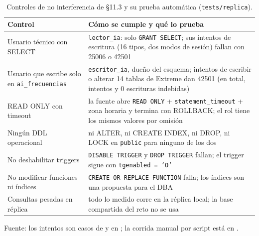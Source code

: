 \documentclass[10pt,a4paper]{article}
\begin{document}
\begin{table}[ht]
\centering\small
\caption{Controles de no interferencia de §11.3 y su prueba automática (\texttt{tests/replica}).}
\begin{tabularx}{\linewidth}{@{}>{\raggedright\arraybackslash}p{4.4cm}X@{}}
\toprule
Control & Cómo se cumple y qué lo prueba \\
\midrule
Usuario técnico con SELECT & \texttt{lector\_ia}: solo \texttt{GRANT SELECT}; sus \NIntentosLector{} intentos de escritura (16 tipos, dos modos de sesión) fallan con 25006 o 42501 \\
Usuario que escribe solo en \texttt{ai\_frecuencias} & \texttt{escritor\_ia}, dueño del esquema; \NIntentosEscritor{} intentos de escribir o alterar 14 tablas de Extreme dan 42501 (en total, \NIntentosTotal{} intentos y 0 escrituras indebidas) \\
READ ONLY con timeout & la fuente abre \texttt{READ ONLY} + \texttt{statement\_timeout} + zona horaria y termina con ROLLBACK; el rol tiene los mismos valores por omisión \\
Ningún DDL operacional & ni ALTER, ni CREATE INDEX, ni DROP, ni LOCK en \texttt{public} para ninguno de los dos \\
No deshabilitar triggers & \texttt{DISABLE TRIGGER} y \texttt{DROP TRIGGER} fallan; el trigger sigue con \texttt{tgenabled = 'O'} \\
No modificar funciones ni índices & \texttt{CREATE OR REPLACE FUNCTION} falla; los índices son una propuesta para el DBA \\
Consultas pesadas en réplica & todo lo medido corre en la réplica local; la base compartida del reto no se usa \\
\bottomrule
\end{tabularx}
{\footnotesize\color{rol-tinta-3}Fuente: los intentos son casos de  y
 en \FuenteIntentos; la corrida manual por script está en
.}
\end{table}

\end{document}
